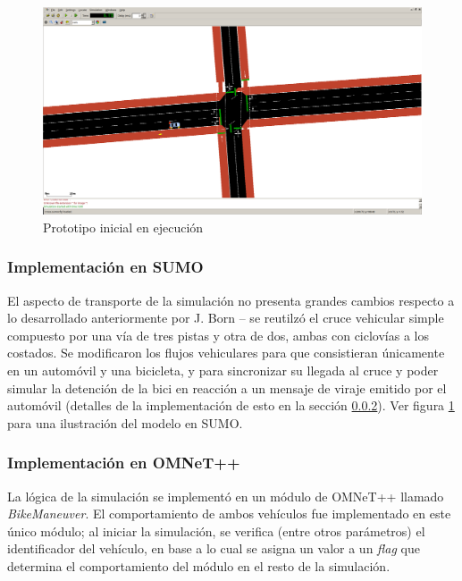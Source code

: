 \documentclass[11pt,letterpaper]{article}
\begin{document}
\begin{figure}[ht]
  \centering
  \includegraphics[width=\linewidth]{prototipo_inicial.png}
  \caption{Prototipo inicial en ejecución}
  \label{fig:sumo_prototype}
\end{figure}

\subsubsection{Implementación en SUMO}

El aspecto de transporte de la simulación no presenta grandes cambios respecto a lo desarrollado anteriormente por J. Born -- se reutilzó el cruce vehicular simple compuesto por una vía de tres pistas y otra de dos, ambas con ciclovías a los costados. Se modificaron los flujos vehiculares para que consistieran únicamente en un automóvil y una bicicleta, y para sincronizar su llegada al cruce y poder simular la detención de la bici en reacción a un mensaje de viraje emitido por el automóvil (detalles de la implementación de esto en la sección \ref{section:prot_communication}). Ver figura \ref{fig:sumo_prototype} para una ilustración del modelo en SUMO.

\subsubsection{Implementación en OMNeT++}\label{section:prot_communication}

La lógica de la simulación se implementó en un módulo de OMNeT++ llamado \emph{BikeManeuver}. El comportamiento de ambos vehículos fue implementado en este único módulo; al iniciar la simulación, se verifica (entre otros parámetros) el identificador del vehículo, en base a lo cual se asigna un valor a un \emph{flag} que determina el comportamiento del módulo en el resto de la simulación.
\end{document}
